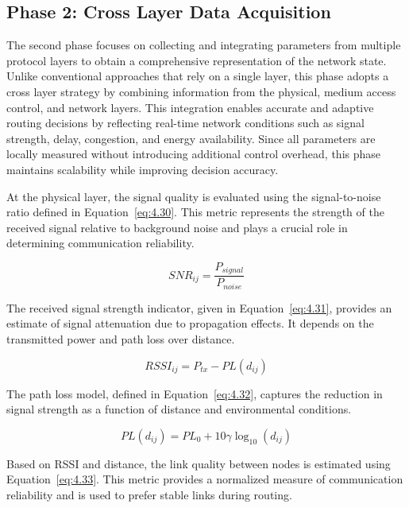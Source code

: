 \documentclass[a4paper,fleqn]{cas-dc}
\numberwithin{equation}{section}
\begin{document}
\subsection{Phase 2: Cross Layer Data Acquisition}

The second phase focuses on collecting and integrating parameters from multiple protocol layers to obtain a comprehensive representation of the network state. Unlike conventional approaches that rely on a single layer, this phase adopts a cross layer strategy by combining information from the physical, medium access control, and network layers. This integration enables accurate and adaptive routing decisions by reflecting real-time network conditions such as signal strength, delay, congestion, and energy availability. Since all parameters are locally measured without introducing additional control overhead, this phase maintains scalability while improving decision accuracy.

At the physical layer, the signal quality is evaluated using the signal-to-noise ratio defined in Equation~\ref{eq:4.30}. This metric represents the strength of the received signal relative to background noise and plays a crucial role in determining communication reliability.

\begin{equation}
SNR_{ij} = \frac{P_{signal}}{P_{noise}}
\label{eq:4.30}
\end{equation}

The received signal strength indicator, given in Equation~\ref{eq:4.31}, provides an estimate of signal attenuation due to propagation effects. It depends on the transmitted power and path loss over distance.

\begin{equation}
RSSI_{ij} = P_{tx} - PL(d_{ij})
\label{eq:4.31}
\end{equation}

The path loss model, defined in Equation~\ref{eq:4.32}, captures the reduction in signal strength as a function of distance and environmental conditions.

\begin{equation}
PL(d_{ij}) = PL_0 + 10\gamma \log_{10}(d_{ij})
\label{eq:4.32}
\end{equation}

Based on RSSI and distance, the link quality between nodes is estimated using Equation~\ref{eq:4.33}. This metric provides a normalized measure of communication reliability and is used to prefer stable links during routing.
\end{document}
